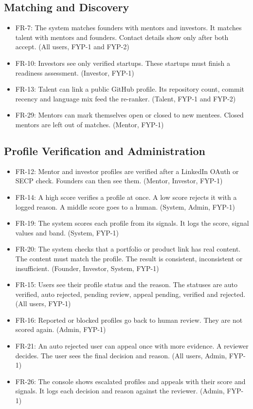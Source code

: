 \documentclass{FastFyp}
\begin{document}
\subsection{Matching and Discovery}
\begin{itemize}
\item FR-7: The system matches founders with mentors and investors. It matches talent with mentors and founders. Contact details show only after both accept. (All users, FYP-1 and FYP-2)
\item FR-10: Investors see only verified startups. These startups must finish a readiness assessment. (Investor, FYP-1)
\item FR-13: Talent can link a public GitHub profile. Its repository count, commit recency and language mix feed the re-ranker. (Talent, FYP-1 and FYP-2)
\item FR-29: Mentors can mark themselves open or closed to new mentees. Closed mentors are left out of matches. (Mentor, FYP-1)
\end{itemize}

\subsection{Profile Verification and Administration}
\begin{itemize}
\item FR-12: Mentor and investor profiles are verified after a LinkedIn OAuth or SECP check. Founders can then see them. (Mentor, Investor, FYP-1)
\item FR-14: A high score verifies a profile at once. A low score rejects it with a logged reason. A middle score goes to a human. (System, Admin, FYP-1)
\item FR-19: The system scores each profile from its signals. It logs the score, signal values and band. (System, FYP-1)
\item FR-20: The system checks that a portfolio or product link has real content. The content must match the profile. The result is consistent, inconsistent or insufficient. (Founder, Investor, System, FYP-1)
\item FR-15: Users see their profile status and the reason. The statuses are auto verified, auto rejected, pending review, appeal pending, verified and rejected. (All users, FYP-1)
\item FR-16: Reported or blocked profiles go back to human review. They are not scored again. (Admin, FYP-1)
\item FR-21: An auto rejected user can appeal once with more evidence. A reviewer decides. The user sees the final decision and reason. (All users, Admin, FYP-1)
\item FR-26: The console shows escalated profiles and appeals with their score and signals. It logs each decision and reason against the reviewer. (Admin, FYP-1)
\end{itemize}
\end{document}
